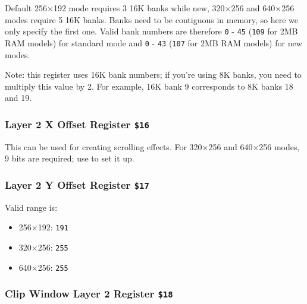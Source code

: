 Default 256$\times$192 mode requires 3 16K banks while new, 320$\times$256 and 640$\times$256 modes require 5 16K banks. Banks need to be contiguous in memory, so here we only specify the first one. Valid bank numbers are therefore {\tt 0} - {\tt 45} ({\tt 109} for 2MB RAM models) for standard mode and {\tt 0} - {\tt 43} ({\tt 107} for 2MB RAM models) for new modes.

Note: this register uses 16K bank numbers; if you're using 8K banks, you need to multiply this value by 2. For example, 16K bank 9 corresponds to 8K banks 18 and 19.


\pagebreak
\subsubsection{Layer 2 X Offset Register {\tt \$16}}

\begin{NextPort}
\end{NextPort}

This can be used for creating scrolling effects. For 320$\times$256 and 640$\times$256 modes, 9 bits are required; use  to set it up.


\subsubsection{Layer 2 Y Offset Register {\tt \$17}}

\begin{NextPort}
\end{NextPort}

Valid range is:

\begin{itemize}[topsep=1pt,itemsep=1pt]
    \item 256$\times$192: {\tt 191}
    \item 320$\times$256: {\tt 255}
    \item 640$\times$256: {\tt 255}
\end{itemize}


\subsubsection{Clip Window Layer 2 Register {\tt \$18}}

